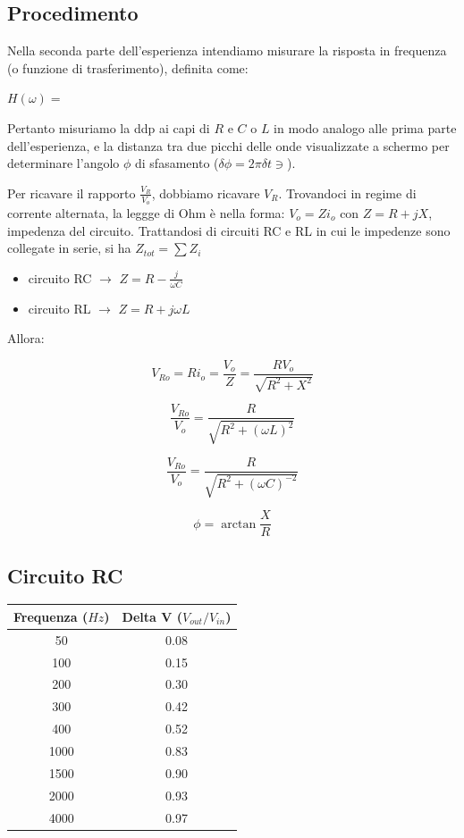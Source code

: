 \subsection{Procedimento}
Nella seconda parte dell'esperienza intendiamo misurare la risposta in frequenza (o funzione di trasferimento), definita come:

$H\left(\omega \right) = $  


Pertanto misuriamo la ddp ai capi di $R$ e $C$ o $L$ in modo analogo alle prima parte dell'esperienza, e la distanza tra due picchi delle onde visualizzate a schermo per determinare l'angolo $\phi$ di sfasamento ($\delta \phi = 2 \pi \delta t \ni$).

Per ricavare il rapporto $\frac{V_{R}}{V_{o}}$, dobbiamo ricavare $V_R$. Trovandoci in regime di corrente alternata, la leggge di Ohm è nella forma: $ V_o = Zi_o$ con $Z = R + jX$, impedenza del circuito.
Trattandosi di circuiti RC e RL in cui le impedenze sono collegate in serie, si ha $Z_{tot} = \sum Z_i$

\begin{itemize}
\item circuito RC $\rightarrow$ $Z=R-\frac{j}{\omega C}$
\item circuito RL $\rightarrow$ $Z=R+j\omega L$
\end{itemize}  

Allora: 


$$V_{Ro} = Ri_o = \frac{V_o}{Z} = \frac{RV_o}{\sqrt{R^2+X^2}} $$


$$\frac{V_{Ro}}{V_o} = \frac{R}{\sqrt{R^2+(\omega L)^2}}$$

$$\frac{V_{Ro}}{V_o} = \frac{R}{\sqrt{R^2+(\omega C)^{-2}}}$$

$$\phi = \arctan \frac{X}{R} $$



\subsection{Circuito RC}


\begin{center}
\begin{tabular}{*{2}{c}}
Frequenza ($Hz$) & Delta V ($V_{out}/V_{in}$) \\
\midrule
50 & 0.08 \\
100 & 0.15 \\
200 & 0.30 \\
300 & 0.42 \\
400 & 0.52 \\
1000 & 0.83 \\
1500 & 0.90 \\
2000 & 0.93 \\
4000 & 0.97 \\
\end{tabular}
\end{center}

